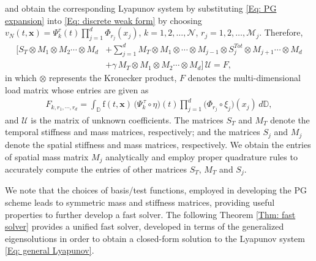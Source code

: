 %
and obtain the corresponding Lyapunov system by substituting \eqref{Eq: PG expansion} into \eqref{Eq: discrete weak form} by choosing $v_N(t,\textbf{x}) = \Psi^{\tau}_k(t) \prod_{j=1}^{d} \Phi^{}_{r_j}(x_j)$, $k = 1,2, \dots, \mathcal{N}$, $r_j= 1,2, \dots, \mathcal{M}_j$. Therefore, 
%
\begin{align}
\label{Eq: general Lyapunov}
%
\Big[
S_{T} \otimes M_1 \otimes M_2 \cdots \otimes M_d 
&+
\sum_{j=1}^{d} 
M_{T} \otimes M_1\otimes \cdots   \otimes M_{j-1} \otimes S_{j}^{{Tot}} \otimes M_{j+1}  \cdots \otimes M_d
\nonumber
\\
&+ 
\gamma \, M_{T}\otimes M_1 \otimes M_2 \cdots \otimes M_d 
\Big] \, 
\mathcal{U}= F,
%
\end{align} 
%
in which $\otimes$ represents the Kronecker product, $F$ denotes the multi-dimensional load matrix whose entries are given as
%
\begin{eqnarray}
\label{Eq: general load matrix}
%
F_{k,r_1,\cdots, r_d} = \int_{\mathbb{D}}^{} \text{f}(t,\textbf{x}) \,
\Big(
\Psi^{\,\tau}_k \circ \eta \Big)(t)
\prod_{j=1}^{d} \Big(\Phi^{}_{r_j} \circ \xi_j\Big)(x_j)\, 
%
d\mathbb{D},
%
\end{eqnarray}
%
and $\mathcal{U}$ is the matrix of unknown coefficients. The matrices $S_{T}$ and $M_{T}$ denote the temporal stiffness and mass matrices, respectively; and the matrices $S_{j}$ and $M_j$ denote the spatial stiffness and mass matrices, respectively. We obtain the entries of spatial mass matrix $M_j$ analytically and employ proper quadrature rules to accurately compute the entries of other matrices $S_{T}$, $M_{T}$ and $S_{j}$.


We note that the choices of basis/test functions, employed in developing the PG scheme leads to symmetric mass and stiffness matrices, providing useful properties to further develop a fast solver. The following Theorem \ref{Thm: fast solver} provides a unified fast solver, developed in terms of the generalized eigensolutions in order to obtain a closed-form solution to the Lyapunov system \eqref{Eq: general Lyapunov}.


